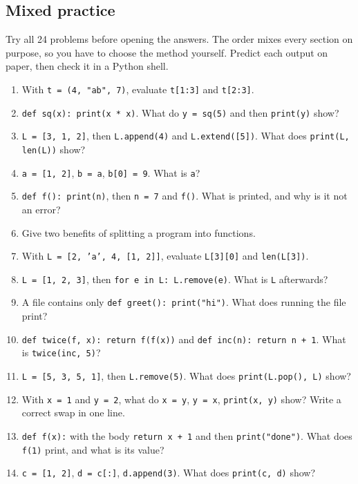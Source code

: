 \documentclass[11pt]{article}
\begin{document}
\clearpage

\begin{keepsection}
\section{Mixed practice}

Try all 24 problems before opening the answers. The order mixes every section on purpose, so you have to choose the method yourself. Predict each output on paper, then check it in a Python shell.

\begin{enumerate}
\item With \texttt{t = (4, "ab", 7)}, evaluate \texttt{t[1:3]} and \texttt{t[2:3]}.
\item \texttt{def sq(x): print(x * x)}. What do \texttt{y = sq(5)} and then \texttt{print(y)} show?
\item \texttt{L = [3, 1, 2]}, then \texttt{L.append(4)} and \texttt{L.extend([5])}. What does \texttt{print(L, len(L))} show?
\item \texttt{a = [1, 2]}, \texttt{b = a}, \texttt{b[0] = 9}. What is \texttt{a}?
\item \texttt{def f(): print(n)}, then \texttt{n = 7} and \texttt{f()}. What is printed, and why is it not an error?
\item Give two benefits of splitting a program into functions.
\item With \texttt{L = [2, 'a', 4, [1, 2]]}, evaluate \texttt{L[3][0]} and \texttt{len(L[3])}.
\item \texttt{L = [1, 2, 3]}, then \texttt{for e in L: L.remove(e)}. What is \texttt{L} afterwards?
\item A file contains only \texttt{def greet(): print("hi")}. What does running the file print?
\item \texttt{def twice(f, x): return f(f(x))} and \texttt{def inc(n): return n + 1}. What is \texttt{twice(inc, 5)}?
\item \texttt{L = [5, 3, 5, 1]}, then \texttt{L.remove(5)}. What does \texttt{print(L.pop(), L)} show?
\item With \texttt{x = 1} and \texttt{y = 2}, what do \texttt{x = y}, \texttt{y = x}, \texttt{print(x, y)} show? Write a correct swap in one line.
\item \texttt{def f(x):} with the body \texttt{return x + 1} and then \texttt{print("done")}. What does \texttt{f(1)} print, and what is its value?
\item \texttt{c = [1, 2]}, \texttt{d = c[:]}, \texttt{d.append(3)}. What does \texttt{print(c, d)} show?

\end{enumerate}
\end{keepsection}
\end{document}
